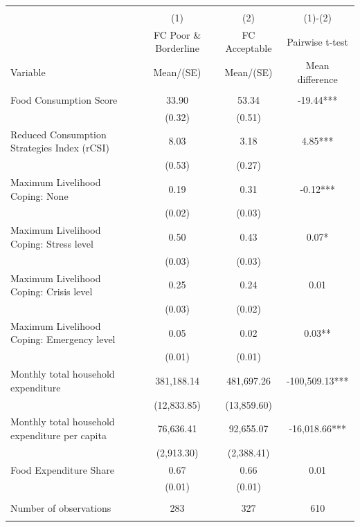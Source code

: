 
\begin{tabular}{@{\extracolsep{5pt}}lccc}
\\[-1.8ex]\hline \hline \\[-1.8ex]
 & \multicolumn{1}{c}{(1)}  & \multicolumn{1}{c}{(2)}  & \multicolumn{1}{c}{(1)-(2)} \\
 & \multicolumn{1}{c}{FC Poor \& Borderline}  & \multicolumn{1}{c}{FC Acceptable}  & \multicolumn{1}{c}{Pairwise t-test}  \\
Variable & Mean/(SE) & Mean/(SE) & Mean difference \\ \hline \\[-1.8ex] 
Food Consumption Score   & 33.90    & 53.34    & -19.44***   \\
 & (0.32)  & (0.51)  &  \\ [1ex]
Reduced Consumption Strategies Index (rCSI)   & 8.03    & 3.18    & 4.85***   \\
 & (0.53)  & (0.27)  &  \\ [1ex]
Maximum Livelihood Coping: None   & 0.19    & 0.31    & -0.12***   \\
 & (0.02)  & (0.03)  &  \\ [1ex]
Maximum Livelihood Coping: Stress level   & 0.50    & 0.43    & 0.07*   \\
 & (0.03)  & (0.03)  &  \\ [1ex]
Maximum Livelihood Coping: Crisis level   & 0.25    & 0.24    & 0.01   \\
 & (0.03)  & (0.02)  &  \\ [1ex]
Maximum Livelihood Coping: Emergency level   & 0.05    & 0.02    & 0.03**   \\
 & (0.01)  & (0.01)  &  \\ [1ex]
Monthly total household expenditure   & 381,188.14    & 481,697.26    & -100,509.13***   \\
 & (12,833.85)  & (13,859.60)  &  \\ [1ex]
Monthly total household expenditure per capita   & 76,636.41    & 92,655.07    & -16,018.66***   \\
 & (2,913.30)  & (2,388.41)  &  \\ [1ex]
Food Expenditure Share   & 0.67    & 0.66    & 0.01   \\
 & (0.01)  & (0.01)  &  \\ [1ex]
\hline \\[-1.8ex]
Number of observations  & 283   & 327  & 610  \\
\hline \hline \\[-1.8ex]

\end{tabular}

